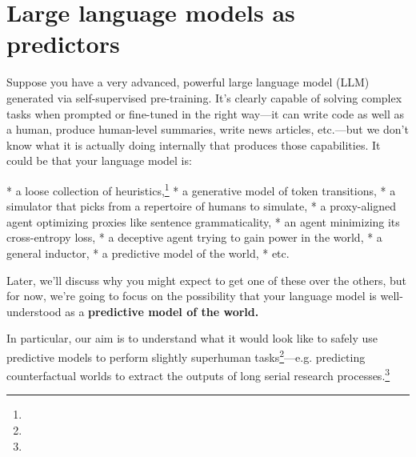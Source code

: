 \section{Large language models as predictors}
\label{sec:1}

Suppose you have a very advanced, powerful large language model (LLM) generated via self-supervised pre-training. It's clearly capable of solving complex tasks when prompted or fine-tuned in the right way---it can write code as well as a human, produce human-level summaries, write news articles, etc.---but we don't know what it is actually doing internally that produces those capabilities. It could be that your language model is:


* a loose collection of heuristics,\footnote{}
* a generative model of token transitions,
* a simulator that picks from a repertoire of humans to simulate,
* a proxy-aligned agent optimizing proxies like sentence grammaticality,
* an agent minimizing its cross-entropy loss,
* a deceptive agent trying to gain power in the world,
* a general inductor,
* a predictive model of the world,
* etc.

Later\cite{TODO: cite TODO: link section 4}, we'll discuss why you might expect to get one of these over the others, but for now, we're going to focus on the possibility that your language model is well-understood as a \textbf{predictive model of the world.}

In particular, our aim is to understand what it would look like to safely use predictive models to perform slightly superhuman tasks\footnote{}---e.g. predicting counterfactual worlds to extract the outputs of long serial research processes.\footnote{}


